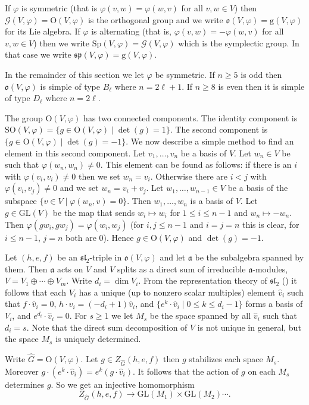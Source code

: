 \documentclass[a4paper,10pt]{amsart}
\newcommand{\GL}{\mathrm{GL}}
\newcommand{\Sp}{\mathrm{Sp}}
\newcommand{\mf}{\mathfrak}
\renewcommand{\sp}{\mf{sp}}
\newcommand{\ssl}{\mf{sl}}
\renewcommand{\a}{\mf{a}}
\renewcommand{\o}{\mf{o}}
\newcommand{\G}{\mathcal{G}}
\renewcommand{\ggg}{\mathrm{g}}
\renewcommand{\O}{\mathrm{O}}
\renewcommand{\Sp}{\mathrm{Sp}}
\newcommand{\wG}{\widehat{G}}
\numberwithin{equation}{section}
\theoremstyle{remark}
\theoremstyle{remark}
\begin{document}
If $\varphi$ is symmetric (that is $\varphi(v,w) = \varphi(w,v)$ for all
$v,w\in V$) then $\G(V,\varphi)=\O(V,\varphi)$ is the orthogonal group and
we write $\o(V,\varphi) = \ggg(V,\varphi)$ for its Lie algebra. If $\varphi$
is alternating (that is, $\varphi(v,w) = -\varphi(w,v)$ for all $v,w\in V$)
then we write $\Sp(V,\varphi) = \G(V,\varphi)$ which is the symplectic
group. In that case we write $\sp(V,\varphi)=\ggg(V,\varphi)$.

In the remainder of this section we let $\varphi$ be symmetric.
If $n\geq 5$ is odd then $\o(V,\varphi)$ is  simple
of type $B_\ell$ where $n=2\ell +1$. If $n\geq 8$ is even then it is simple
of type $D_\ell$ where $n=2\ell$. 

The group $\O(V,\varphi)$ has two connected components. The identity
component is $\mathrm{SO}(V,\varphi) = \{ g\in \O(V,\varphi) \mid
\det(g)=1\}$. The second component is $\{  g\in \O(V,\varphi) \mid
\det(g)=-1\}$. We now describe a simple method to find an element in this
second component. Let $v_1,\ldots,v_n$ be a basis of $V$. Let $w_n\in V$
be such that $\varphi(w_n,w_n)\neq 0$. This element can be found as follows:
if there is an $i$ with $\varphi(v_i,v_i)\neq 0$ then we set $w_n=v_i$.
Otherwise there are $i<j$ with $\varphi(v_i,v_j)\neq 0$ and we set
$w_n=v_i+v_j$. Let $w_1,\ldots,w_{n-1}\in V$ be a basis of the subspace
$\{v\in V \mid \varphi(w_n,v)=0\}$. Then $w_1,\ldots,w_n$ is a basis of $V$.
Let $g\in \GL(V)$ be the map that sends $w_i\mapsto w_i$ for $1\leq i
\leq n-1$ and $w_n\mapsto -w_n$. Then $\varphi(gw_i,gw_j)=\varphi(w_i,w_j)$
(for $i,j\leq n-1$ and $i=j=n$ this is clear, for $i\leq n-1$, $j=n$ both are
0). Hence $g\in \O(V,\varphi)$ and $\det(g)=-1$.

Let $(h,e,f)$ be an $\ssl_2$-triple in $\o(V,\varphi)$ and let $\a$ be the
subalgebra
spanned by them. Then $\a$ acts on $V$ and $V$ splits as a direct sum of
irreducible $\a$-modules, $V=V_1\oplus\cdots \oplus V_m$. Write
$d_i=\dim V_i$. From the representation theory of $\ssl_2$
(\cite[\S II.7]{hum}) it follows that
each $V_i$ has a unique (up to nonzero scalar multiples)
element $\hat v_i$ such that $f\cdot \hat v_i = 0$, $h\cdot \hat v_i=
(-d_i+1)\hat v_i$,
and $\{e^k \cdot \hat v_i\mid 0\leq k\leq d_i-1\}$ forms a basis of $V_i$,
and $e^{d_i} \cdot \hat v_i=0$.
For $s\geq 1$ we let $M_s$ be the space spanned by all $\hat v_i$ such that
$d_i=s$. Note that the direct sum decomposition of $V$ is not unique in
general, but the space $M_s$ is uniquely determined.

Write $\wG = \O(V,\varphi)$. Let $g\in Z_{\wG}(h,e,f)$ then $g$ stabilizes each
space $M_s$. Moreover $g\cdot (e^k\cdot \hat v_i) = e^k (g\cdot \hat v_i)$.
It follows that the action of $g$ on each $M_s$ determines $g$. So we get
an injective homomorphism
\begin{equation}\label{fun}
Z_{\wG}(h,e,f) \to \GL(M_1)\times \GL(M_2) \cdots  .
\end{equation}
\end{document}
